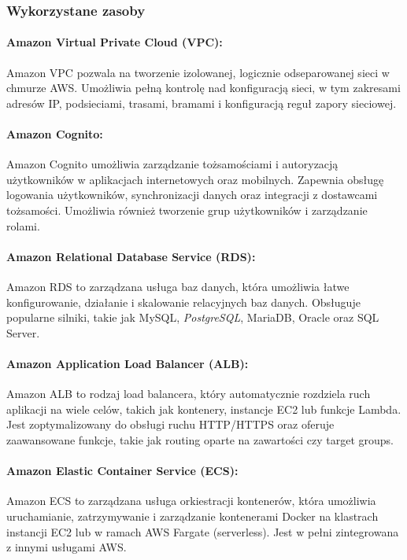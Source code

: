 \documentclass[../../main.tex]{subfiles}
\begin{document}
    \subsubsection{Wykorzystane zasoby}
        \paragraph{Amazon Virtual Private Cloud (VPC):}
        Amazon VPC pozwala na tworzenie izolowanej, logicznie odseparowanej sieci w chmurze AWS. Umożliwia pełną kontrolę nad konfiguracją sieci, w tym zakresami adresów IP, podsieciami, trasami, bramami i konfiguracją reguł zapory sieciowej.
        
        \paragraph{Amazon Cognito:}
        Amazon Cognito umożliwia zarządzanie tożsamościami i autoryzacją użytkowników w aplikacjach internetowych oraz mobilnych. Zapewnia obsługę logowania użytkowników, synchronizacji danych oraz integracji z dostawcami tożsamości. Umożliwia również tworzenie grup użytkowników i zarządzanie rolami.
        
        \paragraph{Amazon Relational Database Service (RDS):}
        Amazon RDS to zarządzana usługa baz danych, która umożliwia łatwe konfigurowanie, działanie i skalowanie relacyjnych baz danych. Obsługuje popularne silniki, takie jak MySQL, \textit{PostgreSQL}, MariaDB, Oracle oraz SQL Server.
        
        \paragraph{Amazon Application Load Balancer (ALB):}
        Amazon ALB to rodzaj load balancera, który automatycznie rozdziela ruch aplikacji na wiele celów, takich jak kontenery, instancje EC2 lub funkcje Lambda. Jest zoptymalizowany do obsługi ruchu HTTP/HTTPS oraz oferuje zaawansowane funkcje, takie jak routing oparte na zawartości czy target groups.
        
        \paragraph{Amazon Elastic Container Service (ECS):}
        Amazon ECS to zarządzana usługa orkiestracji kontenerów, która umożliwia uruchamianie, zatrzymywanie i zarządzanie kontenerami Docker na klastrach instancji EC2 lub w ramach AWS Fargate (serverless). Jest w pełni zintegrowana z innymi usługami AWS.
        
\end{document}
